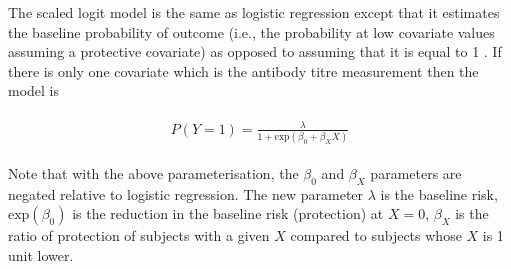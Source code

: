 The scaled logit model is the same as logistic regression except that it estimates the baseline probability of outcome (i.e., the probability at low covariate values assuming a protective covariate) as opposed to assuming that it is equal to 1 \cite{Dunning;2006}. If there is only one covariate which is the antibody titre measurement then the model is

\begin{align*}
\begin{gathered}
P(Y=1) = \frac{\lambda}{1 + \text{exp}(\beta_0 + \beta_X X)}
\end{gathered}
\end{align*}

Note that with the above parameterisation, the $\beta_0$ and $\beta_X$ parameters are negated relative to logistic regression. The new parameter $\lambda$ is the baseline risk, $\text{exp}(\beta_0)$ is the reduction in the baseline risk (protection) at $X=0$, $\beta_X$ is the ratio of protection of subjects with a given $X$ compared to subjects whose $X$ is 1 unit lower.
